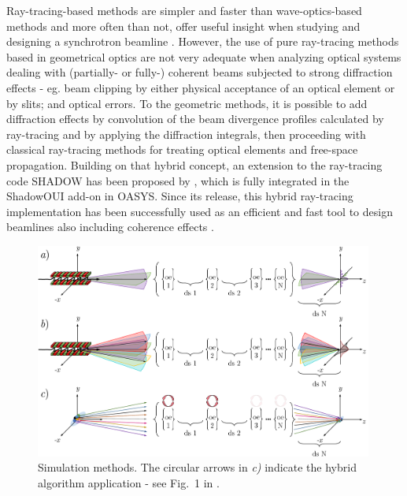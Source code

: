 \documentclass{iucr}              %
\begin{document}
Ray-tracing-based methods are simpler and faster than wave-optics-based methods and more often than not, offer useful insight when studying and designing a synchrotron beamline \cite{hierarchical}. However, the use of pure ray-tracing methods based in geometrical optics are not very adequate when analyzing optical systems dealing with (partially- or fully-) coherent beams subjected to strong diffraction effects - eg. beam clipping by either physical acceptance of an optical element or by slits; and optical errors. To the geometric methods, it is possible to add diffraction effects by convolution of the beam divergence profiles calculated by ray-tracing and by applying the diffraction integrals, then proceeding with classical ray-tracing methods for treating optical elements and free-space propagation. Building on that hybrid concept, an extension to the ray-tracing code SHADOW \cite{codeSHADOW} has been proposed by , which is fully integrated in the ShadowOUI \cite{codeSHADOWOUI} add-on in OASYS. Since its release, this hybrid ray-tracing implementation has been successfully used as an efficient and fast tool to design beamlines also including coherence effects \cite{Shi2017,Luca2020, Lordano2022}.

\begin{figure}\label{fig:sim_meth}
    \centering
    \includegraphics[width=0.99\textwidth]{simulation_methods.pdf}
    \caption{Simulation methods. The circular arrows in \textit{c)} indicate the hybrid algorithm application - see Fig.~1 in \cite{codeHYBRID}.}
\end{figure}


\end{document}

